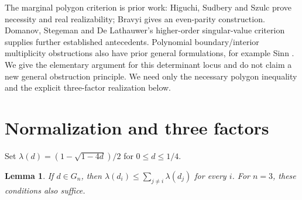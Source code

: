 \documentclass[11pt]{article}
\newtheorem{lemma}{Lemma}
\newcommand{\lam}{\lambda}
\begin{document}
The marginal polygon criterion is prior work: Higuchi, Sudbery and Szulc \cite{HSS} prove necessity and real realizability; Bravyi \cite[Section 2]{Bravyi} gives an even-parity construction. Domanov, Stegeman and De Lathauwer's higher-order singular-value criterion \cite[Theorems 1.4--1.5]{DSL} supplies further established antecedents. Polynomial boundary/interior multiplicity obstructions also have prior general formulations, for example Sinn \cite[Lemma 4.2(b)]{Sinn}. We give the elementary argument for this determinant locus and do not claim a new general obstruction principle. We need only the necessary polygon inequality and the explicit three-factor realization below.

\section{Normalization and three factors}
Set \(\lam(d)=(1-\sqrt{1-4d})/2\) for \(0\leq d\leq1/4\).
\begin{lemma}\label{lem:ball}
If \(d\in G_n\), then \(\lam(d_i)\leq\sum_{j\ne i}\lam(d_j)\) for every \(i\). For \(n=3\), these conditions also suffice.
\end{lemma}
\end{document}
